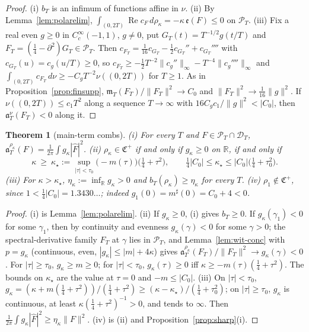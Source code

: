 \documentclass[11pt]{amsart}
\newtheorem{theorem}{Theorem}[section]
\theoremstyle{definition}
\theoremstyle{remark}
\newcommand{\R}{\mathbb R}
\newcommand{\Rel}{\operatorname{Re}}
\newcommand{\PT}{\mathcal P_T}
\newcommand{\Fh}{\widehat F}
\newcommand{\cF}{c_F}
\newcommand{\mT}{\mathfrak m_T}
\begin{document}
\begin{proof}
(i) $b_T$ is an infimum of functions affine in $\nu$. (ii) By Lemma~\ref{lem:polarelim},
$\int_{(0,2T)}\Rel\cF\,d\rho_\kappa=-\kappa\,\mathfrak e(F)\le0$ on $\PT$. (iii) Fix a real even $g\ge0$ in $C_c^\infty(-1,1)$, $g\ne0$,
put $G_T(t)=T^{-1/2}g(t/T)$ and $F_T=(\frac14-\partial^2)G_T\in\PT$. Then
$c_{F_T}=\frac1{16}c_{G_T}-\frac12c_{G_T}''+c_{G_T}''''$ with $c_{G_T}(u)=c_g(u/T)\ge0$, so
$c_{F_T}\ge-\frac12T^{-2}\|c_g''\|_\infty-T^{-4}\|c_g''''\|_\infty$ and
$\int_{(0,2T)}c_{F_T}\,d\nu\ge-C_gT^{-2}\nu((0,2T))$ for $T\ge1$. As in Proposition~\ref{prop:finsupp},
$\mT(F_T)/\|F_T\|^2\to C_0$ and $\|F_T\|^2\to\frac1{16}\|g\|^2$. If $\nu((0,2T))\le c_1T^2$ along a sequence $T\to\infty$ with
$16C_gc_1/\|g\|^2<|C_0|$, then $\mathfrak a^\nu_T(F_T)<0$ along it.
\end{proof}

\begin{theorem}[main-term combs]\label{thm:kappa}
\emph{(i)} For every $T$ and $F\in\PT\cap\mathcal D_T$, $\mathfrak a^{\rho_\kappa}_T(F)=\frac1{2\pi}\int g_\kappa|\Fh|^2$.
\emph{(ii)} $\rho_\kappa\in\mathfrak C^+$ if and only if $g_\kappa\ge0$ on $\R$, if and only if
\[
\kappa\ \ge\ \kappa_\star:=\sup_{|\tau|<\tau_0}\big(-m(\tau)\big)\big(\tfrac14+\tau^2\big),\qquad
\tfrac14|C_0|\le\kappa_\star\le|C_0|\big(\tfrac14+\tau_0^2\big).
\]
\emph{(iii)} For $\kappa>\kappa_\star$, $\eta_\kappa:=\inf_\R g_\kappa>0$ and $b_T(\rho_\kappa)\ge\eta_\kappa$ for every $T$.
\emph{(iv)} $\rho_1\notin\mathfrak C^+$, since $1<\frac14|C_0|=1.3430\ldots$; indeed $g_1(0)=m^\sharp(0)=C_0+4<0$.
\end{theorem}

\begin{proof}
(i) is Lemma~\ref{lem:polarelim}. (ii) If $g_\kappa\ge0$, (i) gives $b_T\ge0$. If $g_\kappa(\gamma_1)<0$ for some $\gamma_1$, then by continuity and
evenness $g_\kappa(\gamma)<0$ for some $\gamma>0$; the spectral-derivative family $F_T$ at $\gamma$ lies in $\PT$, and
Lemma~\ref{lem:wit-conc} with $p=g_\kappa$ (continuous, even, $|g_\kappa|\le|m|+4\kappa$) gives
$\mathfrak a^{\rho_\kappa}_T(F_T)/\|F_T\|^2\to g_\kappa(\gamma)<0$. For $|\tau|\ge\tau_0$, $g_\kappa\ge m\ge0$; for $|\tau|<\tau_0$,
$g_\kappa(\tau)\ge0$ iff $\kappa\ge-m(\tau)(\frac14+\tau^2)$. The bounds on $\kappa_\star$ are the value at $\tau=0$ and
$-m\le|C_0|$. (iii) On $|\tau|<\tau_0$, $g_\kappa=(\kappa+m(\frac14+\tau^2))/(\frac14+\tau^2)\ge(\kappa-\kappa_\star)/(\frac14+\tau_0^2)$;
on $|\tau|\ge\tau_0$, $g_\kappa$ is continuous, at least $\kappa(\frac14+\tau^2)^{-1}>0$, and tends to $\infty$. Then
$\frac1{2\pi}\int g_\kappa|\Fh|^2\ge\eta_\kappa\|F\|^2$. (iv) is (ii) and Proposition~\ref{prop:sharp}(i).
\end{proof}
\end{document}
